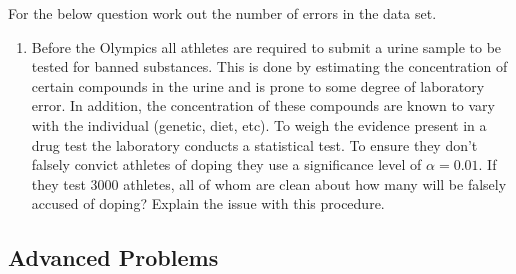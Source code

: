 \documentclass[
]{book}
\providecommand{\tightlist}{%
  \setlength{\itemsep}{0pt}\setlength{\parskip}{0pt}}
\theoremstyle{definition}
\theoremstyle{definition}
\theoremstyle{definition}
\theoremstyle{definition}
\theoremstyle{remark}
\begin{document}
For the below question work out the number of errors in the data set.

\begin{enumerate}
\def\labelenumi{\arabic{enumi}.}
\setcounter{enumi}{2}
\tightlist
\item
  Before the Olympics all athletes are required to submit a urine sample to be tested for banned substances. This is done by estimating the concentration of certain compounds in the urine and is prone to some degree of laboratory error. In addition, the concentration of these compounds are known to vary with the individual (genetic, diet, etc). To weigh the evidence present in a drug test the laboratory conducts a statistical test. To ensure they don't falsely convict athletes of doping they use a significance level of \(\alpha=0.01\). If they test 3000 athletes, all of whom are clean about how many will be falsely accused of doping? Explain the issue with this procedure.
\end{enumerate}

\hypertarget{advanced-problems-13}{%
\subsection{Advanced Problems}\label{advanced-problems-13}}
\end{document}
